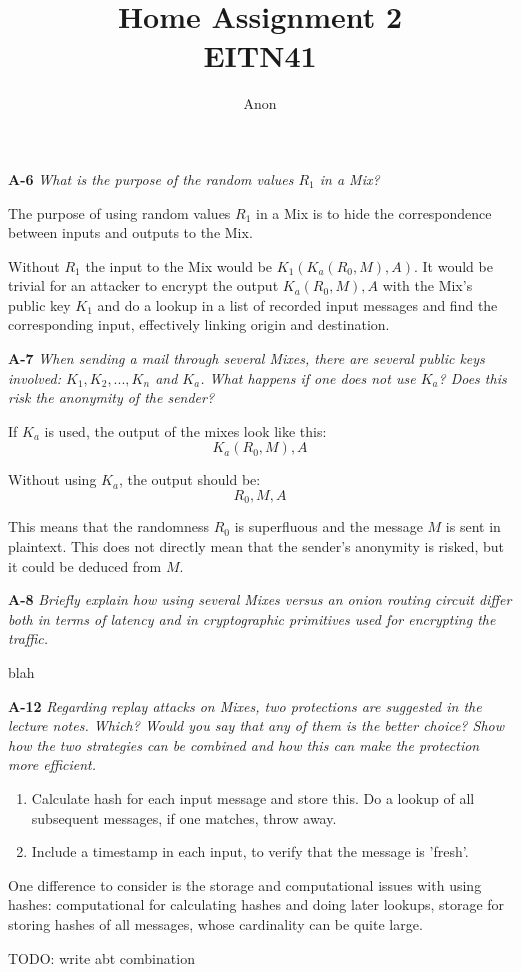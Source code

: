 \documentclass[a4paper]{article}
\title{Home Assignment 2 \\ EITN41}
\author{Anon}
\date{}
\newcommand{\Q}[2]{ \vspace{10pt} \textbf{#1} \textit{#2} }
\newcommand{\A}[1]{ #1 }
\begin{document}
\maketitle

\Q{A-6} { %
  What is the purpose of the random values $R_1$ in a Mix?
}

\A{
  The purpose of using random values $R_1$ in a Mix is
  to hide the correspondence between inputs and outputs to the Mix.

  Without $R_1$ the input to the Mix would be
  $K_1(K_a(R_0,M),A)$. It would be trivial for an attacker to encrypt
  the output $K_a(R_0,M),A$ with the Mix's public key $K_1$
  and do a lookup in a list of recorded input messages 
  and find the corresponding input, effectively linking
  origin and destination.
}

\Q{A-7} { %
  When sending a mail through several Mixes, there are several public keys 
  involved: $K_1,K_2, . . . ,K_n$ and $K_a$. 
  What happens if one does not use $K_a$? 
  Does this risk the anonymity of the sender?
}

\A{
  If $K_a$ is used, the output of the mixes look like this:
  \begin{displaymath}
    K_a(R_0,M),A
  \end{displaymath}

  Without using $K_a$, the output should be:
  \begin{displaymath}
    R_0,M,A
  \end{displaymath}

  This means that the randomness $R_0$ is superfluous 
  and the message $M$ is sent in plaintext. This does not
  directly mean that the sender's anonymity is risked, but 
  it could be deduced from $M$.
}

\Q{A-8} {
 Briefly explain how using several Mixes versus an onion routing 
 circuit differ both in terms of latency and in cryptographic 
 primitives used for encrypting the traffic. 
}

\A{
  blah
}

\Q{A-12} {
  Regarding replay attacks on Mixes, two protections are suggested in the lecture notes. 
  Which? Would you say that any of them is the better choice?
  Show how the two strategies can be combined and how this
  can make the protection more efficient.
}

\A{
  \begin{enumerate}
    \item Calculate hash for each input message and store this.
    Do a lookup of all subsequent messages, if one matches, 
    throw away.
    \item Include a timestamp in each input, to verify that 
    the message is 'fresh'.
  \end{enumerate}

  One difference to consider is the storage and computational
  issues with using hashes: computational for calculating
  hashes and doing later lookups, storage for storing hashes of
  all messages, whose cardinality can be quite large.

  TODO: write abt combination
}
\end{document}
